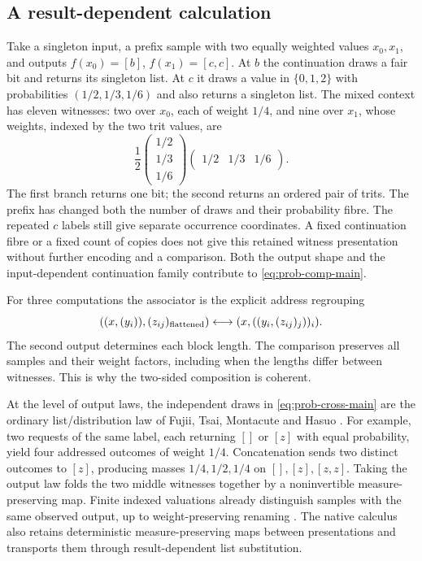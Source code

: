 \documentclass[11pt]{article}
\numberwithin{equation}{section}
\theoremstyle{definition}\newtheorem{definition}[theorem]{Definition}
\begin{document}
\subsection{A result-dependent calculation}
Take a singleton input, a prefix sample with two equally weighted values
$x_0,x_1$, and outputs $f(x_0)=[b]$, $f(x_1)=[c,c]$. At $b$ the
continuation draws a fair bit and returns its singleton list. At $c$ it
draws a value in $\{0,1,2\}$ with probabilities $(1/2,1/3,1/6)$ and also
returns a singleton list. The mixed context has eleven witnesses: two over
$x_0$, each of weight $1/4$, and nine over $x_1$, whose weights, indexed by
the two trit values, are
\[
 \frac12\begin{pmatrix}1/2\\1/3\\1/6\end{pmatrix}
          \begin{pmatrix}1/2&1/3&1/6\end{pmatrix}.
\]
The first branch returns one bit; the second returns an ordered pair of
trits. The prefix has changed both the number of draws and their probability
fibre. The repeated $c$ labels still give separate occurrence coordinates.
A fixed continuation fibre or a fixed count of copies does not give this
retained witness presentation without further encoding and a comparison.
Both the output shape and the input-dependent continuation family contribute
to \eqref{eq:prob-comp-main}.

For three computations the associator is the explicit address regrouping
\[
 ((x,(y_i)),(z_{ij})_{\rm flattened})
       \longleftrightarrow(x,((y_i,(z_{ij})_j))_i).
\]
The second output determines each block length. The comparison preserves
all samples and their weight factors, including when the lengths differ
between witnesses. This is why the two-sided composition is coherent.

At the level of output laws, the independent draws in
\eqref{eq:prob-cross-main} are the ordinary list/distribution law of
Fujii, Tsai, Montacute and Hasuo \cite[Ex.~20, Prop.~36, Ex.~38 and Thm.~42]{fujii}.
For example, two requests of the same label, each returning $[]$ or $[z]$
with equal probability, yield four addressed outcomes of weight $1/4$.
Concatenation sends two distinct outcomes to $[z]$, producing masses
$1/4,1/2,1/4$ on $[],[z],[z,z]$. Taking the output law folds the two
middle witnesses together by a noninvertible measure-preserving map.
Finite indexed valuations already distinguish samples with the same
observed output, up to weight-preserving renaming
\cite[Defs.~4.1--4.3]{varaccawinskel}. The native calculus also retains
deterministic measure-preserving maps between presentations and
transports them through result-dependent list substitution.
\end{document}

